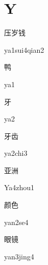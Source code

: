 ﻿%
\section*{Y}

\begin{verbete}{压岁钱}
\begin{pronuncia}{ya1sui4qian2}
\end{pronuncia}
\end{verbete}

\begin{verbete}[ya1]{鸭}
\begin{pronuncia}{ya1}
\end{pronuncia}
\end{verbete}

\begin{verbete}[ya2]{牙}
\begin{pronuncia}{ya2}
\end{pronuncia}
\end{verbete}

\begin{verbete}[ya2chi3]{牙齿}
\begin{pronuncia}{ya2chi3}
\end{pronuncia}
\end{verbete}

\begin{verbete}[Ya4zhou1]{亚洲}
\begin{pronuncia}{Ya4zhou1}
\end{pronuncia}
\end{verbete}

\begin{verbete}[yan2se4]{颜色}
\begin{pronuncia}{yan2se4}
\end{pronuncia}
\end{verbete}

\begin{verbete}{眼镜}
\begin{pronuncia}{yan3jing4}
\end{pronuncia}
\end{verbete}

